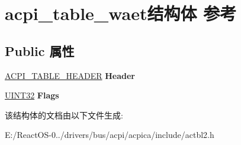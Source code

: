 \hypertarget{structacpi__table__waet}{}\section{acpi\+\_\+table\+\_\+waet结构体 参考}
\label{structacpi__table__waet}
\subsection*{Public 属性}
\begin{DoxyCompactItemize}
\item 
\mbox{\label{structacpi__table__waet_ad00a59129a7af80a01fff3da0f892ea6}} 
\hyperlink{structacpi__table__header}{A\+C\+P\+I\+\_\+\+T\+A\+B\+L\+E\+\_\+\+H\+E\+A\+D\+ER} {\bfseries Header}
\item 
\mbox{\label{structacpi__table__waet_a1757065fd9afee10db8d3c657e9e418c}} 
\hyperlink{_processor_bind_8h_ae1e6edbbc26d6fbc71a90190d0266018}{U\+I\+N\+T32} {\bfseries Flags}
\end{DoxyCompactItemize}


该结构体的文档由以下文件生成\+:\begin{DoxyCompactItemize}
\item 
E\+:/\+React\+O\+S-\/0../drivers/bus/acpi/acpica/include/actbl2.\+h\end{DoxyCompactItemize}

